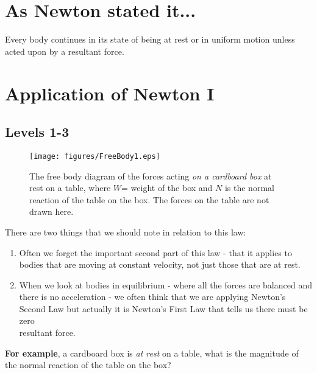 




\addtolength{\topmargin}{-0.7 cm}
\setlength{\columnsep}{22pt}

\section{As Newton stated it...}

Every body continues in its state of being at rest or in uniform motion unless acted upon by a resultant force.
\setlength{\columnsep}{22pt}
\section{Application of Newton I}
\subsection*{Levels 1-3}
\begin{wrapfigure}{r}{6cm}
\vspace{-2.0cm}
\center
\texttt{[image: figures/FreeBody1.eps]}
\caption{The free body diagram of the forces acting {\it on a cardboard box} at rest on a table, where $W$= weight of the box and $N$ is the normal reaction of the table on the box.  The forces on the table are not drawn here.}\vspace{-3.5cm}
\end{wrapfigure}

There are two things that we should note in relation to this law:
\begin{enumerate}
\item Often we forget the important second part of this law - that it applies to bodies that are moving at constant velocity, not just those that are at rest.   

\item When we look at bodies in equilibrium - where all the forces are balanced and there is no acceleration - we often think that we are applying Newton's Second Law but actually it is Newton's First Law that tells us there must be zero\\
resultant force.

\end{enumerate}
{\bf For example}, a cardboard box is {\it at rest} on a table, what is the magnitude of the normal reaction of the table on the box? \\

